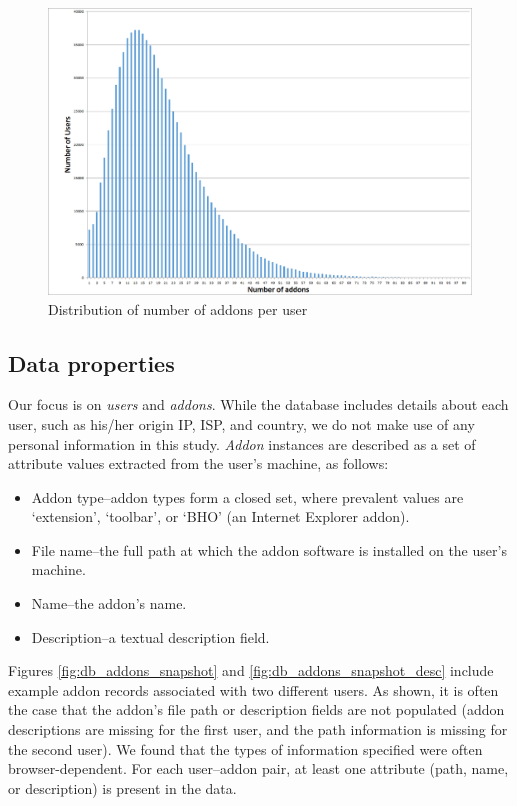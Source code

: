 \documentclass[ijoc,nonblindrev]{informs3} %
\numberwithin{equation}{subsection}
\begin{document}
\begin{figure}[!htbp]
\centering
\includegraphics[width=\linewidth]{figures/user_addons_histogram.png}
\caption{Distribution of number of addons per user}
\label{fig:user_addons_histogram}
\end{figure}

\subsection{Data properties}

Our focus is on {\it users} and {\it addons}. While the database includes details about each user, such as his/her origin IP, ISP, and country, we do not make use of any personal information in this study. {\it Addon} instances are described as a set of attribute values extracted from the user's machine, as follows:
\begin{itemize}
\item Addon type--addon types form a closed set, where prevalent values are `extension', `toolbar', or `BHO' (an Internet Explorer addon).
\item File name--the full path at which the addon software is installed on the user's machine. 
\item Name--the addon's name. 
\item Description--a textual description field. 
\end{itemize}
Figures \ref{fig:db_addons_snapshot} and \ref{fig:db_addons_snapshot_desc} include example addon records associated with two different users. As shown, it is often the case that the addon's file path or description fields are not populated (addon descriptions are missing for the first user, and the path information is missing for the second user). We found that the types of information specified were often browser-dependent. For each user--addon pair, at least one attribute (path, name, or description) is present in the data.
\end{document}
